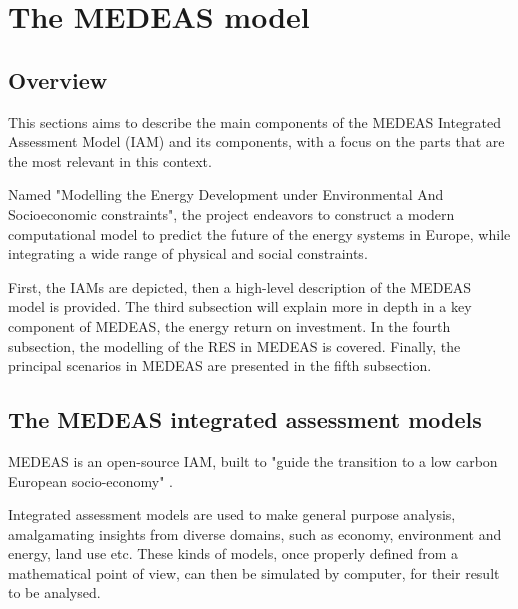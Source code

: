 \section{The MEDEAS model}

\subsection{Overview}

This sections aims to describe the main components of the MEDEAS Integrated Assessment Model (IAM) and its components, with a focus on the parts that are the most relevant in this context.

Named "Modelling the Energy Development under Environmental And Socioeconomic constraints", the project endeavors to construct a modern computational model to predict the future of the energy systems in Europe, while integrating a wide range of physical and social constraints.

First, the IAMs are depicted, then a high-level description of the MEDEAS model is provided. The third subsection will explain more in depth in a key component of MEDEAS, the energy return on investment. In the fourth subsection, the modelling of the RES in MEDEAS is covered. Finally, the principal scenarios in MEDEAS are presented in the fifth subsection.


\subsection{The MEDEAS integrated assessment models}

MEDEAS is an open-source IAM, built to "guide the transition to a low carbon European socio-economy" \cite{medeas-website}.

Integrated assessment models are used to make general purpose analysis, amalgamating insights from diverse domains, such as economy, environment and energy, land use etc. These kinds of models, once properly defined from a mathematical point of view, can then be simulated by computer, for their result to be analysed.

